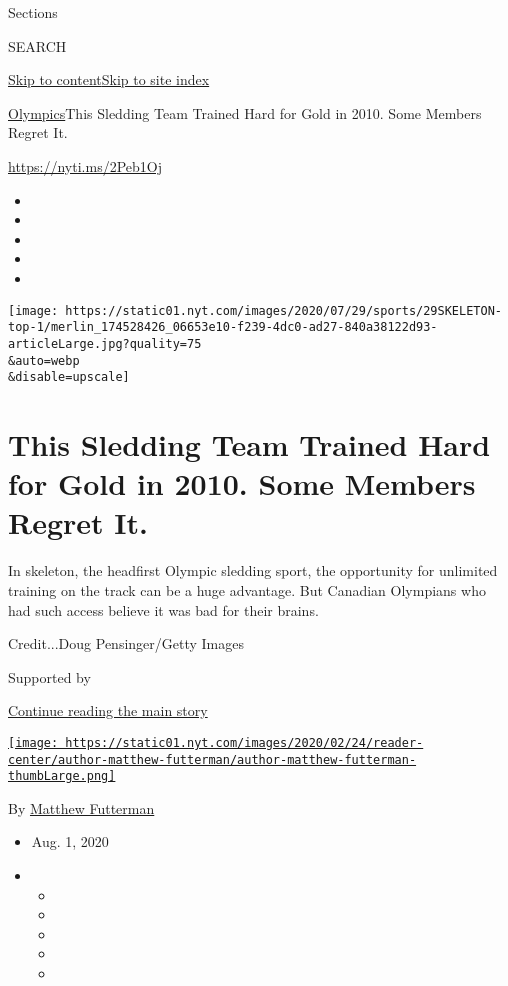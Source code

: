 Sections

SEARCH

\protect\hyperlink{site-content}{Skip to
content}\protect\hyperlink{site-index}{Skip to site index}

\href{/section/sports/olympics}{Olympics}\textbar{}This Sledding Team
Trained Hard for Gold in 2010. Some Members Regret It.

\url{https://nyti.ms/2Peb1Oj}

\begin{itemize}
\item
\item
\item
\item
\item
\end{itemize}

\texttt{[image: https://static01.nyt.com/images/2020/07/29/sports/29SKELETON-top-1/merlin\_174528426\_06653e10-f239-4dc0-ad27-840a38122d93-articleLarge.jpg?quality=75\\\&auto=webp\\\&disable=upscale]}

\hypertarget{this-sledding-team-trained-hard-for-gold-in-2010-some-members-regret-it}{%
\section{This Sledding Team Trained Hard for Gold in 2010. Some Members
Regret
It.}\label{this-sledding-team-trained-hard-for-gold-in-2010-some-members-regret-it}}

In skeleton, the headfirst Olympic sledding sport, the opportunity for
unlimited training on the track can be a huge advantage. But Canadian
Olympians who had such access believe it was bad for their brains.

Credit...Doug Pensinger/Getty Images

Supported by

\protect\hyperlink{after-sponsor}{Continue reading the main story}

\href{https://www.nytimes.com/by/matthew-futterman}{\texttt{[image: https://static01.nyt.com/images/2020/02/24/reader-center/author-matthew-futterman/author-matthew-futterman-thumbLarge.png]}}

By \href{https://www.nytimes.com/by/matthew-futterman}{Matthew
Futterman}

\begin{itemize}
\item
  Aug. 1, 2020
\item
  \begin{itemize}
  \item
  \item
  \item
  \item
  \item
  \end{itemize}
\end{itemize}


